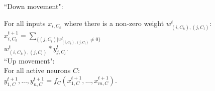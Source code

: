 \documentclass{beamer}
\begin{document}
\begin{frame}
{\begin{columns}[T]
\begin{column}{0.7\textwidth}

\end{column}
\begin{column}{0.3\textwidth}

{%
\tiny
``Down movement": 

For all inputs $x_{i,C_k}$ where there is a non-zero weight $w_{(i,C_k), (j,C_l)}^t$:\\[1ex]

{\scriptsize$x_{i,C_k}^{t+1} = \sum_{\{(j,C_l) | w_{(i,C_k), (j,C_l)}^t \neq 0\}}$\\[0.1ex]$w_{(i,C_k), (j,C_l)}^t * y_{j, C_l}^{t}.$}\\[3ex]

``Up movement":\\[0.1ex]  

For all active neurons $C$:\\[1ex]

{\scriptsize $y^{t+1}_{1,C},...,y^{t+1}_{n,C} = f_C (x^{t+1}_{1,C},...,x^{t+1}_{m,C})$.}
}

\end{column}
\end{columns}
}


\end{frame}
\end{document}

